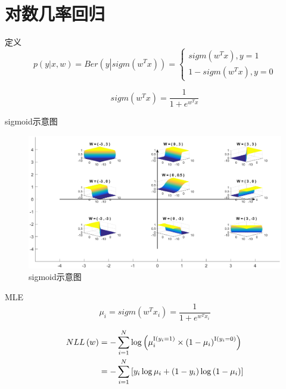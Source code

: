 \documentclass[xetex,mathserif,serif]{beamer}
\begin{document}
\section{对数几率回归}
\begin{frame}{定义}
    \[p\left( {y\left| {x,w} \right.} \right) = Ber\left( {y\left| {sigm\left( {{w^T}x} \right)} \right.} \right) = \left\{ {\begin{array}{*{20}{l}}
    {sigm\left( {{w^T}x} \right),y = 1}\\
    {1 - sigm\left( {{w^T}x} \right),y = 0}
    \end{array}} \right.\]

    \[sigm\left( {{w^T}x} \right) = \frac{1}{{1 + {e^{{w^T}x}}}}\]
\end{frame}

\begin{frame}{sigmoid示意图}
\begin{figure}
  \centering
  \includegraphics[width=\textwidth]{sigmoid.eps}
  \caption{sigmoid示意图}\label{3}
\end{figure}

\end{frame}

\begin{frame}{MLE}
\[{\mu _i} = sigm\left( {{w^T}{x_i}} \right) = \frac{1}{{1 + {e^{{w^T}{x_i}}}}}\]

\begin{equation*}
\begin{aligned} %
    NLL\left( w \right) 
    & = - \sum\limits_{i = 1}^N {\log \left( {\mu _i^{{\rm{I}}\left( {{y_i} = 1} \right)} \times {{\left( {1 - {\mu _i}} \right)}^{{\rm{I}}\left( {{y_i} = 0} \right)}}} \right)} \\
    & =  - \sum\limits_{i = 1}^N {\left[ {{y_i}\log {\mu _i} + \left( {1 - {y_i}} \right)\log \left( {1 - {\mu _i}} \right)} \right]}
\end{aligned}
\end{equation*}
\end{frame}
\end{document}
